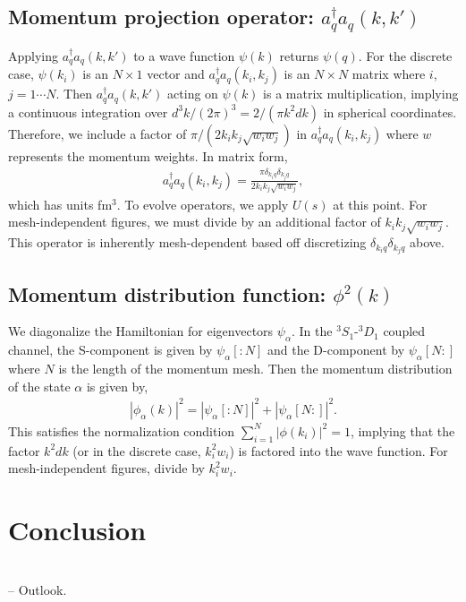 \documentclass[preprintnumbers,floatfix,aps,prc,preprint,nofootinbib]{revtex4-1}
\begin{document}
\subsection{Momentum projection operator: $a^{\dagger}_q a_q (k, k')$}
\label{sec:momentum_proj_operator}


Applying $a^{\dagger}_q a_q (k, k')$ to a wave function $\psi(k)$ returns $\psi(q)$. For the discrete case, $\psi(k_i)$ is an $N \times 1$ vector and $a^{\dagger}_q a_q (k_i, k_j)$ is an $N \times N$ matrix where $i$, $j=1\cdots N$. Then $a^{\dagger}_q a_q (k, k')$ acting on $\psi(k)$ is a matrix multiplication, implying a continuous integration over $d^3k / (2 \pi)^3 = 2 / (\pi k^2 dk)$ in spherical coordinates. Therefore, we include a factor of $\pi / (2 k_i k_j \sqrt{w_i w_j})$ in $a^{\dagger}_q a_q (k_i, k_j)$ where $w$ represents the momentum weights. In matrix form,
%
\begin{eqnarray}
	\label{eq:momentum_projection_operator}
	a^{\dagger}_q a_q (k_i, k_j) = \frac{\pi \delta_{k_i q} \delta_{k_j q}}{2 k_i k_j \sqrt{w_i w_j}},
\end{eqnarray}
%
which has units fm$^3$. To evolve operators, we apply $U(s)$ at this point. For mesh-independent figures, we must divide by an additional factor of $k_i k_j \sqrt{w_i w_j}$. This operator is inherently mesh-dependent based off discretizing $\delta_{k_i q} \delta_{k_j q}$ above.


\subsection{Momentum distribution function: $\phi^2(k)$}
\label{sec:momentum_dist_funcs}


We diagonalize the Hamiltonian for eigenvectors $\psi_{\alpha}$. In the $^{3}S_1$-$^{3}D_1$ coupled channel, the S-component is given by $\psi_{\alpha}[: \! N]$ and the D-component by $\psi_{\alpha}[N \! :]$ where $N$ is the length of the momentum mesh. Then the momentum distribution of the state $\alpha$ is given by,
%
\begin{eqnarray}
	\label{eq:momentum_distribution}
	|\phi_{\alpha}(k)|^2 = |\psi_{\alpha}[: \! N]|^2 + |\psi_{\alpha}[N \! :]|^2.
\end{eqnarray}
%
This satisfies the normalization condition $\sum_{i=1}^N |\phi(k_i)|^2 = 1$, implying that the factor $k^2 dk$ (or in the discrete case, $k_i^2 w_i$) is factored into the wave function. For mesh-independent figures, divide by $k_i^2 w_i$.


\section{Conclusion}
\label{sec:conclusion}


\\
-- Outlook.





\end{document}
